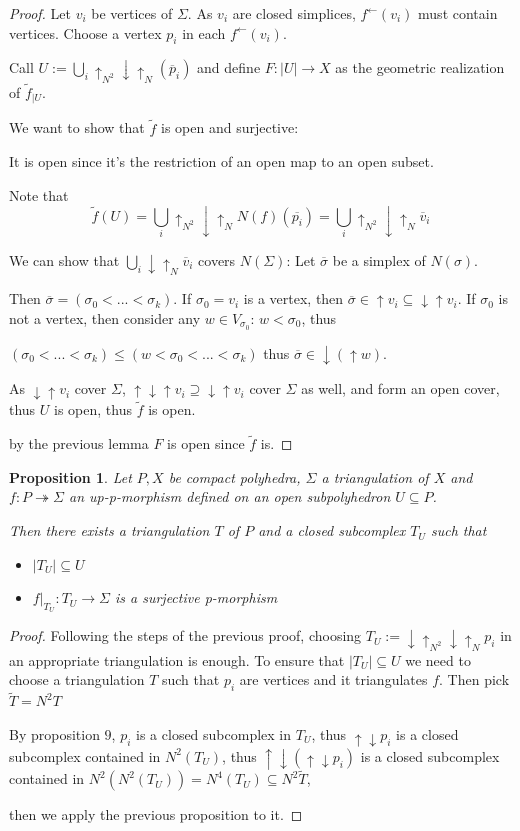 \documentclass[12pt]{article}
\newtheorem{proposition}[theorem]{Proposition}
\numberwithin{equation}{subsection}
\begin{document}
\begin{proof}
	Let $v_i$ be vertices of $\Sigma$. As $v_i$ are closed simplices, $f^{\gets}(v_i)$ must contain vertices. Choose a vertex $p_i$ in each $f^{\gets}(v_i)$.
	
	Call $U:=\bigcup_i\uparrow_{N^2}\downarrow\uparrow_N(\overline p_i)$
	and define $F:|U|\to X$ as the geometric realization of $\tilde{f}_{|U}$.
	
	We want to show that $\tilde{f}$ is open and surjective:
	
	It is open since it's the restriction of an open map to an open subset.
	
	Note that \[\tilde{f}(U)=\bigcup_i \uparrow_{N^2}\downarrow\uparrow_NN(f)(\overline{p_i})=\bigcup_i\uparrow_{N^2}\downarrow\uparrow_N \overline v_i\]

We can show that $\bigcup_i\downarrow\uparrow_N\overline v_i$ covers $N(\Sigma)$: 
Let $\overline\sigma$ be a simplex of $N(\sigma).$

Then $\overline\sigma=(\sigma_0<...<\sigma_k).$
If $\sigma_0=v_i$ is a vertex, then $\overline\sigma\in \uparrow v_i\subseteq \downarrow\uparrow v_i$.
If $\sigma_0$ is not a vertex, then consider any $w\in V_{\sigma_0}$: $w<\sigma_0$, thus 

$(\sigma_0<...<\sigma_k)\leq (w<\sigma_0<...<\sigma_k)$ thus $\overline\sigma\in \downarrow (\uparrow w)$.

As $\downarrow\uparrow v_i$ cover $\Sigma$, $\uparrow\downarrow\uparrow v_i\supseteq \downarrow\uparrow v_i$ cover $\Sigma$ as well, and form an open cover, thus $U$ is open, thus $\tilde{f}$ is open.

by the previous lemma $F$ is open since $\tilde{f}$ is.
\end{proof}

\begin{proposition}
	Let $P,X$ be compact polyhedra, $\Sigma$ a triangulation of $X$ and $f:P\twoheadrightarrow \Sigma$ an up-p-morphism defined on an open subpolyhedron $U\subseteq P$.
	
	Then there exists a triangulation $T$ of $P$ and a closed subcomplex $T_U$ such that
	\begin{itemize}
		\item $|T_U|\subseteq U$
		\item $f|_{T_U}:T_U\to\Sigma$ is a surjective p-morphism
	\end{itemize}
\end{proposition}
\begin{proof}
	Following the steps of the previous proof, choosing $T_U:=\downarrow\uparrow_{N^2}\downarrow\uparrow_N p_i$ in an appropriate triangulation is enough.
	To ensure that $|T_U|\subseteq U$ we need to choose a triangulation $T$ such that $p_i$ are vertices and it triangulates $f$.
	Then pick $\tilde{T}=N^2 T$
	
	By proposition $9$, $p_i$ is a closed subcomplex in $T_U$, thus $\uparrow\downarrow p_i$ is a closed subcomplex contained in $N^2(T_U)$, thus $\uparrow\downarrow(\uparrow\downarrow p_i)$ is a closed subcomplex contained in $N^2(N^2(T_U))=N^4(T_U)\subseteq N^2\tilde T$,
	
	then we apply the previous proposition to it.
\end{proof}
\end{document}
